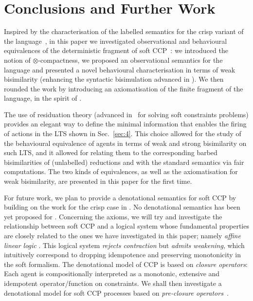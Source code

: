 \documentclass[main.tex]{subfiles}
\begin{document}
\section{Conclusions and Further Work}\label{sec:conclusions}
Inspired by the characterisation of the labelled semantics for the crisp variant of the language~\cite{pippo}, 
in this paper we investigated observational and behavioural 
equivalences of the deterministic fragment of soft CCP~\cite{scc}: we introduced 
the notion of $\otimes$-compactness, we proposed an observational semantics for the language  and 
presented a novel behavioural characterisation in terms of weak bisimilarity 
(enhancing the syntactic bisimulation advanced in \cite{fun14}).
 We then rounded the work by introducing 
 an axiomatisation of the finite fragment of the language, in the spirit of \cite{popl91}. 
 
The use of residuation theory (advanced in~\cite{ecai06} for solving soft constraints problems)
provides an elegant way to define the minimal information 
that enables the firing of actions in the LTS shown in Sec.~\ref{sec:4}. 
 This choice allowed for the study of the behavioural equivalence of agents in terms of weak and strong bisimilarity on such LTS, 
 and it allowed for relating them to the corresponding barbed bisimilarities of (unlabelled) reductions
 and with the standard semantics via fair computations.
 The two kinds of equivalences, as well as the axiomatisation for weak bisimilarity, are presented in this paper for the first time.

For future work, we plan to provide a denotational semantics for soft CCP by building on the work for the crisp case in \cite{popl91}. 
%
No denotational semantics has been yet proposed for \cite{scc}.
Concerning the axioms, we will try and investigate the relationship between soft CCP and a logical system whose fundamental 
properties are closely related to the ones we have investigated
in this paper; namely \emph{affine linear logic} \cite{LagoM04}. %
%
This logical system  \emph{rejects contraction} 
but \emph{admits weakening}, which intuitively correspond to dropping idempotence and preserving
monotonicity in the soft formalism.  %
The denotational model of CCP is based on \emph{closure operators}: Each 
agent is compositionally interpreted as a monotonic, extensive and idempotent operator/function on constraints.
%
We shall then investigate a denotational 
model for soft CCP  processes based on \emph{pre-closure operators}~\cite{general-topology}.
\end{document}
